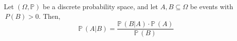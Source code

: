 \documentclass[aspectratio=169]{beamer}
\begin{document}
\begin{wallpaperframe}
Let $(\Omega, \mathbb{P})$ be a discrete probability space, and let $A, B \subseteq \Omega$ be events with $\mathbb\,{P}(B) > 0$. Then,
\[
\mathbb{P}\,(A|B) = \frac{\mathbb{P}\,(B|A) \cdot \mathbb{P}\,(A)}{\mathbb{P}\,(B)}
\]
\end{wallpaperframe}
\end{document}
